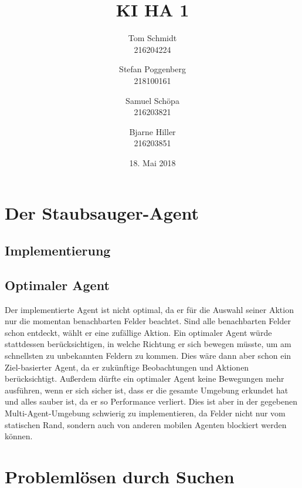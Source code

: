 \documentclass[fleqn]{scrartcl}
\author{Tom Schmidt\\216204224 \and Stefan Poggenberg\\218100161 \and Samuel Schöpa\\216203821 \and Bjarne Hiller\\216203851}
\title{KI HA 1}
\date{18. Mai 2018}
\begin{document}
\maketitle
\section{Der Staubsauger-Agent}
\subsection{Implementierung}

\subsection{Optimaler Agent}
Der implementierte Agent ist nicht optimal, da er für die Auswahl seiner Aktion nur die momentan benachbarten Felder beachtet. Sind alle benachbarten Felder schon entdeckt, wählt er eine zufällige Aktion. Ein optimaler Agent würde stattdessen berücksichtigen, in welche Richtung er sich bewegen müsste, um am schnellsten zu unbekannten Feldern zu kommen. Dies wäre dann aber schon ein Ziel-basierter Agent, da er zukünftige Beobachtungen und Aktionen berücksichtigt. Außerdem dürfte ein optimaler Agent keine Bewegungen mehr ausführen, wenn er sich sicher ist, dass er die gesamte Umgebung erkundet hat und alles sauber ist, da er so Performance verliert. Dies ist aber in der gegebenen Multi-Agent-Umgebung schwierig zu implementieren, da Felder nicht nur vom statischen Rand, sondern auch von anderen mobilen Agenten blockiert werden können.
\section{Problemlösen durch Suchen}
\end{document}
